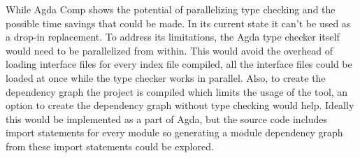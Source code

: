 While Agda Comp shows the potential of parallelizing type checking and the
possible time savings that could be made. In its current state it can't be used
as a drop-in replacement. To address its limitations, the Agda type checker
itself would need to be parallelized from within. This would avoid the overhead
of loading interface files for every index file compiled, all the interface
files could be loaded at once while the type checker works in parallel. Also,
to create the dependency graph the project is compiled which limits the usage
of the tool, an option to create the dependency graph without type checking
would help. Ideally this would be implemented as a part of Agda, but the source
code includes import statements for every module so generating a module
dependency graph from these import statements could be explored.

%
